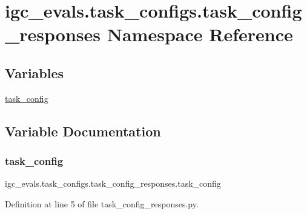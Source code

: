 \hypertarget{namespaceigc__evals_1_1task__configs_1_1task__config__responses}{}\section{igc\+\_\+evals.\+task\+\_\+configs.\+task\+\_\+config\+\_\+responses Namespace Reference}
\label{namespaceigc__evals_1_1task__configs_1_1task__config__responses}
\subsection*{Variables}
\begin{DoxyCompactItemize}
\item 
\hyperlink{namespaceigc__evals_1_1task__configs_1_1task__config__responses_ac0c50e1b1f864b396f86784880381ac8}{task\+\_\+config}
\end{DoxyCompactItemize}


\subsection{Variable Documentation}
\mbox{\label{namespaceigc__evals_1_1task__configs_1_1task__config__responses_ac0c50e1b1f864b396f86784880381ac8}} 
\subsubsection{\texorpdfstring{task\+\_\+config}{task\_config}}
{\footnotesize\ttfamily igc\+\_\+evals.\+task\+\_\+configs.\+task\+\_\+config\+\_\+responses.\+task\+\_\+config}



Definition at line 5 of file task\+\_\+config\+\_\+responses.\+py.


